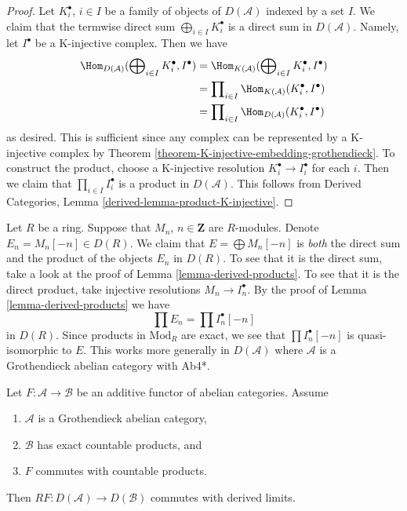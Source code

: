 \begin{proof}
Let $K^\bullet_i$, $i \in I$ be a family of objects of $D(\mathcal{A})$
indexed by a set $I$. We claim that the termwise direct sum
$\bigoplus_{i \in I} K^\bullet_i$ is a direct sum in $D(\mathcal{A})$.
Namely, let $I^\bullet$ be a K-injective complex. Then we have
\begin{align*}
\Hom_{D(\mathcal{A})}(\bigoplus\nolimits_{i \in I} K^\bullet_i, I^\bullet)
& =
\Hom_{K(\mathcal{A})}(\bigoplus\nolimits_{i \in I} K^\bullet_i, I^\bullet) \\
& =
\prod\nolimits_{i \in I} \Hom_{K(\mathcal{A})}(K^\bullet_i, I^\bullet) \\
& =
\prod\nolimits_{i \in I} \Hom_{D(\mathcal{A})}(K^\bullet_i, I^\bullet)
\end{align*}
as desired. This is sufficient since any complex can be represented
by a K-injective complex by
Theorem \ref{theorem-K-injective-embedding-grothendieck}.
To construct the product, choose a K-injective resolution
$K_i^\bullet \to I_i^\bullet$ for each $i$. Then we claim that
$\prod_{i \in I} I_i^\bullet$ is a product in $D(\mathcal{A})$.
This follows from
Derived Categories, Lemma \ref{derived-lemma-product-K-injective}.
\end{proof}

\begin{remark}
\label{remark-direct-sum-product-derived}
Let $R$ be a ring. Suppose that $M_n$, $n \in \mathbf{Z}$ are $R$-modules.
Denote $E_n = M_n[-n] \in D(R)$. We claim that $E = \bigoplus M_n[-n]$ is
{\it both} the direct sum and the product of the objects $E_n$ in $D(R)$.
To see that it is the direct sum, take a look at the proof of
Lemma \ref{lemma-derived-products}.
To see that it is the direct product, take injective resolutions
$M_n \to I_n^\bullet$. By the proof of
Lemma \ref{lemma-derived-products}
we have
$$
\prod E_n = \prod I_n^\bullet[-n]
$$
in $D(R)$. Since products in $\text{Mod}_R$ are exact, we see that
$\prod I_n^\bullet[-n]$ is quasi-isomorphic to $E$. This works more generally
in $D(\mathcal{A})$ where $\mathcal{A}$ is a Grothendieck abelian
category with Ab4*.
\end{remark}

\begin{lemma}
\label{lemma-RF-commutes-with-Rlim}
Let $F : \mathcal{A} \to \mathcal{B}$ be an additive functor of
abelian categories. Assume
\begin{enumerate}
\item $\mathcal{A}$ is a Grothendieck abelian category,
\item $\mathcal{B}$ has exact countable products, and
\item $F$ commutes with countable products.
\end{enumerate}
Then
$RF : D(\mathcal{A}) \to D(\mathcal{B})$ commutes with derived limits.
\end{lemma}

